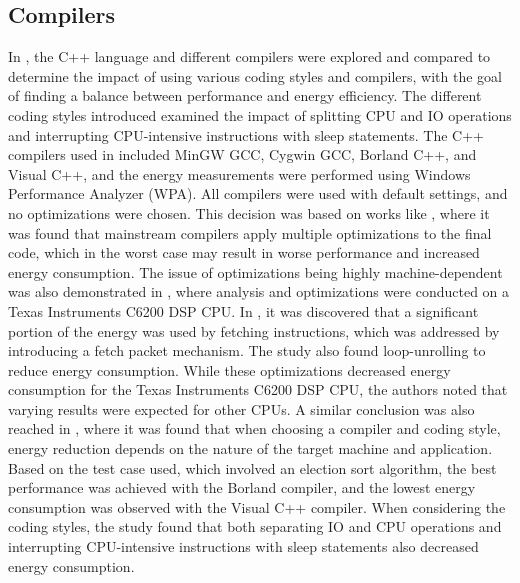 \subsection{Compilers}
In \cite{hassan2017}, the C++ language and different compilers were explored and compared to determine the impact of using various coding styles and compilers, with the goal of finding a balance between performance and energy efficiency. The different coding styles introduced examined the impact of splitting CPU and IO operations and interrupting CPU-intensive instructions with sleep statements. The C++ compilers used in \cite{hassan2017} included MinGW GCC, Cygwin GCC, Borland C++, and Visual C++, and the energy measurements were performed using Windows Performance Analyzer (WPA). All compilers were used with default settings, and no optimizations were chosen. This decision was based on works like \cite{lima2013}, where it was found that mainstream compilers apply multiple optimizations to the final code, which in the worst case may result in worse performance and increased energy consumption. The issue of optimizations being highly machine-dependent was also demonstrated in \cite{cooper2004}, where analysis and optimizations were conducted on a Texas Instruments C6200 DSP CPU. In \cite{cooper2004}, it was discovered that a significant portion of the energy was used by fetching instructions, which was addressed by introducing a fetch packet mechanism. The study also found loop-unrolling to reduce energy consumption. While these optimizations decreased energy consumption for the Texas Instruments C6200 DSP CPU, the authors noted that varying results were expected for other CPUs. A similar conclusion was also reached in \cite{hassan2017}, where it was found that when choosing a compiler and coding style, energy reduction depends on the nature of the target machine and application. Based on the test case used, which involved an election sort algorithm, the best performance was achieved with the Borland compiler, and the lowest energy consumption was observed with the Visual C++ compiler. When considering the coding styles, the study found that both separating IO and CPU operations and interrupting CPU-intensive instructions with sleep statements also decreased energy consumption.